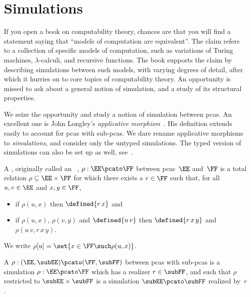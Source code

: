 \section{Simulations}
\label{sec:simulations}%

If you open a book on computability theory, chances are that you will find a statement saying that ``models of computation are equivalent''. The claim refers to a collection of specific models of computation, such as variations of Turing machines, $\lambda$-calculi, and recursive functions. The book supports the claim by describing simulations between such models, with varying degrees of detail, after which it hurries on to core topics of computability theory. An opportunity is missed to ask about a general notion of simulation, and a study of its structural properties.


We seize the opportunity and study a notion of simulation between pcas. An excellent one is John Longley's \emph{applicative morphism}~. His definition extends easily to account for pcas with sub-pcas. We dare rename applicative morphisms to \emph{simulations}, and consider only the untyped simulations. The typed version of simulations can also be set up as well, see~.

\begin{definition}
  \label{def:simulation}%
  A , originally called an ~\cite{Longley:95},
  $\rho: \EE \pcato \FF$ between pcas~$\EE$ and~$\FF$ is a total relation $\rho
  \subseteq \EE \times \FF$ for which there exists a  $r \in \FF$
  such that, for all $u, v \in \EE$ and $x, y \in \FF$,
  \begin{itemize}
  \item if $\rho(u, x)$ then $\defined{r \, x}$ and
  \item if $\rho(u, x)$, $\rho(v, y)$ and $\defined{u \, v}$ then
    $\defined{r \, x \, y}$ and $\rho(u \, v, r \, x \, y)$.
  \end{itemize}
  We write $\rho[u] = \set{x \in \FF \such \rho(u, x)}$.

  A  $\rho: (\EE, \subEE) \pcato (\FF, \subFF)$ between pcas with sub-pcas is a simulation
  $\rho : \EE \pcato \FF$ which has a realizer $r \in \subFF$, and such that $\rho$ restricted to $\subEE \times \subFF$ is a simulation $\subEE \pcato \subFF$ realized by~$r$.
\end{definition}

